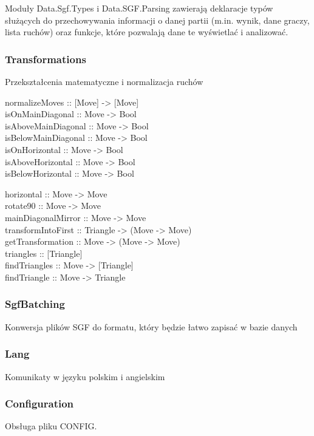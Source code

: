 \documentclass[10pt,leqno]{article}
\begin{document}
Moduły Data.Sgf.Types i Data.SGF.Parsing zawierają deklaracje typów służących do 
przechowywania informacji o danej partii (m.in. wynik, dane graczy, lista ruchów) oraz funkcje, które
pozwalają dane te wyświetlać i analizować. 

\subsubsection{Transformations}
Przekształcenia matematyczne i normalizacja ruchów

\begin{framed}
\noindent normalizeMoves :: [Move] -> [Move] \\

\noindent isOnMainDiagonal :: Move -> Bool  \\
isAboveMainDiagonal :: Move -> Bool \\
isBelowMainDiagonal :: Move -> Bool \\
isOnHorizontal :: Move -> Bool \\
isAboveHorizontal :: Move -> Bool \\
isBelowHorizontal :: Move -> Bool

\noindent horizontal :: Move -> Move \\
rotate90 :: Move -> Move \\
mainDiagonalMirror :: Move -> Move \\

\noindent transformIntoFirst :: Triangle -> (Move -> Move) \\
getTransformation :: Move -> (Move -> Move) \\

\noindent triangles :: [Triangle] \\
findTriangles :: Move -> [Triangle] \\
findTriangle :: Move -> Triangle
\end{framed}

\subsubsection{SgfBatching}
Konwersja plików SGF do formatu, który będzie łatwo zapisać w bazie danych

\subsubsection{Lang}
Komunikaty w języku polskim i angielskim

\subsubsection{Configuration}
Obsługa pliku CONFIG.
\end{document}
